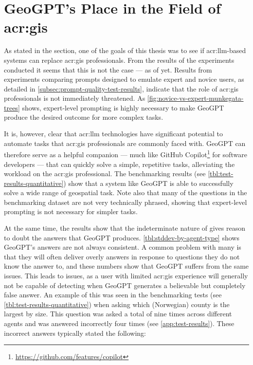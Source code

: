 \section[GeoGPT's Place in the Field of GIS]{GeoGPT's Place in the Field of \acrshort{acr:gis}}

As stated in the  section, one of the goals of this thesis was to see if \acrshort{acr:llm}-based systems can replace \acrshort{acr:gis} professionals. From the results of the experiments conducted it seems that this is not the case --- as of yet. Results from experiments comparing prompts designed to emulate expert and novice users, as detailed in \autoref{subsec:prompt-quality-test-results}, indicate that the role of \acrshort{acr:gis} professionals is not immediately threatened. As \autoref{fig:novice-vs-expert-munkegata-trees} shows, expert-level prompting is highly necessary to make GeoGPT produce the desired outcome for more complex tasks.

It is, however, clear that \acrshort{acr:llm} technologies have significant potential to automate tasks that \acrshort{acr:gis} professionals are commonly faced with. GeoGPT can therefore serve as a helpful companion --- much like GitHub Copilot\footnote{\url{https://github.com/features/copilot}} for software developers --- that can quickly solve a simple, repetitive tasks, alleviating the workload on the \acrshort{acr:gis} professional. The benchmarking results (see \autoref{tbl:test-results-quantitative}) show that a system like GeoGPT is able to successfully solve a wide range of geospatial task. Note also that many of the questions in the benchmarking dataset are not very technically phrased, showing that expert-level prompting is not necessary for simpler tasks.

At the same time, the results show that the indeterminate nature of  gives reason to doubt the answers that GeoGPT produces. \autoref{tbl:stddev-by-agent-type} shows GeoGPT's answers are not always consistent. A common problem with many  is that they will often deliver overly answers in response to questions they do not know the answer to, and these numbers show that GeoGPT suffers from the same issues. This leads to issues, as a user with limited \acrshort{acr:gis} experience will generally not be capable of detecting when GeoGPT generates a believable but completely false answer. An example of this was seen in the benchmarking tests (see \autoref{tbl:test-results-quantitative}) when asking which (Norwegian) county is the largest by size. This question was asked a total of nine times across different agents and was answered incorrectly four times (see \autoref{app:test-results}). These incorrect answers typically stated the following:

